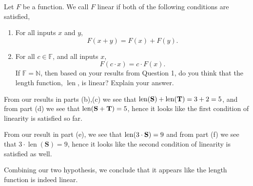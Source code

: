 \documentclass[12pt]{article} %
\begin{document}
\newpage

\begin{qstn}
  Let $F$ be a function. We call $F$ linear if both of the following conditions are satisfied,
  \begin{enumerate}
    \item For all inputs $x$ and $y$, 
      \[
          F(x+y) = F(x) + F(y)
      .\] 
    \item For all $c \in \mathbb F$, and all inputs $x$,
       \[
          F(c\cdot x) = c\cdot F(x)
      .\] 
  If $\mathbb F = \mathbb N$, then based on your results from Question 1, do you think that the length function, 
  $ \operatorname{len}$, is linear?
  Explain your answer.
  \end{enumerate}
  \begin{solution}
    From our results in parts (b),(c) we see that $ \operatorname{len}(\vb S) + \operatorname{len}(\vb T) = 3 +
    2 =  5$, and from  part (d) we see that $ \operatorname{len}(\vb S + \vb T) = 5$, hence it looks like the first
    condition of linearity is satisfied so far.

    From our result in part (e), we see that $\operatorname{len}(3\cdot \vb S) = 9$ and from part (f) we see 
    that  $3\cdot \operatorname{len}(\textbf{S}) = 9$, hence it looks like the second condition of linearity is
    satisfied as well.

    Combining our two hypothesis, we conclude that it appears like the length function is indeed linear.
  \end{solution}

\end{qstn}
\end{document}
